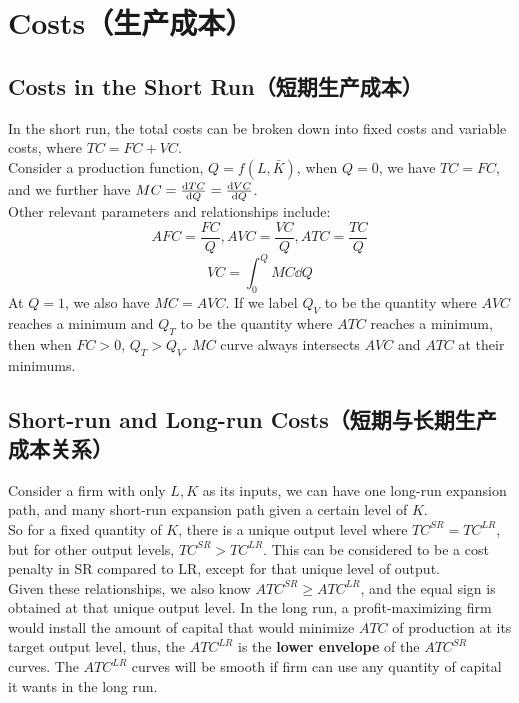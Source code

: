 \section{Costs（生产成本）}
\subsection{Costs in the Short Run（短期生产成本）}
In the short run, the total costs can be broken down into fixed costs and variable costs, where $TC = FC + VC$. \\
Consider a production function, $Q = f(L, \bar{K})$, when $Q = 0$, we have $TC = FC$, and we further have $MC = \dv{TC}{Q} = \dv{VC}{Q}$. \\
Other relevant parameters and relationships include:
$$AFC = \frac{FC}{Q}, AVC = \frac{VC}{Q}, ATC = \frac{TC}{Q}$$
$$VC = \int_0^Q MC \dd Q$$
At $Q = 1$, we also have $MC = AVC$. If we label $Q_V$ to be the quantity where $AVC$ reaches a minimum and $Q_T$ to be the quantity where $ATC$ reaches a minimum, then when $FC > 0$, $Q_T > Q_V$. $MC$ curve always intersects $AVC$ and $ATC$ at their minimums.

\subsection{Short-run and Long-run Costs（短期与长期生产成本关系）}
Consider a firm with only $L, K$ as its inputs, we can have one long-run expansion path, and many short-run expansion path given a certain level of $K$. \\
So for a fixed quantity of $K$, there is a unique output level where $TC^{SR} = TC^{LR}$, but for other output levels, $TC^{SR} > TC^{LR}$. This can be considered to be a cost penalty in SR compared to LR, except for that unique level of output. \\
Given these relationships, we also know $ATC^{SR} \ge ATC^{LR}$, and the equal sign is obtained at that unique output level. In the long run, a profit-maximizing firm would install the amount of capital that would minimize $ATC$ of production at its target output level, thus, the $ATC^{LR}$ is the \textbf{lower envelope} of the $ATC^{SR}$ curves. The $ATC^{LR}$ curves will be smooth if firm can use any quantity of capital it wants in the long run.
